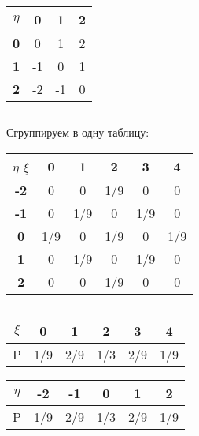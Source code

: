 \documentclass[a4paper,10pt]{article}
\begin{document}
\begin{center}
\begin{tabular}{|c|c|c|c|}
\hline
$\eta$ & \textbf{0} & \textbf{1} & \textbf{2} \\
\hline
\textbf{0} & 0 & 1 & 2 \\
\hline
\textbf{1} & -1 & 0 & 1 \\
\hline
\textbf{2} & -2 & -1 & 0 \\
\hline
\end{tabular}
\end{center}

\subsection{}
Сгруппируем в одну таблицу:

\begin{center}
\begin{tabular}{|c|c|c|c|c|c|}
\hline
$\eta$ \vline $\xi$ & \textbf{0} & \textbf{1} & \textbf{2} & \textbf{3} & \textbf{4} \\
\hline
\textbf{-2} & 0 & 0 & 1/9 & 0 & 0 \\
\hline
\textbf{-1} & 0 & 1/9 & 0 & 1/9 & 0 \\
\hline
\textbf{0} & 1/9 & 0 & 1/9 & 0 & 1/9 \\
\hline
\textbf{1} & 0 & 1/9 & 0 & 1/9 & 0 \\
\hline
\textbf{2} & 0 & 0 & 1/9 & 0 & 0 \\
\hline
\end{tabular}
\end{center}

\subsection{}

\begin{center}
\begin{tabular}{|c|c|c|c|c|c|}
\hline
$\xi$ & \textbf{0} & \textbf{1} & \textbf{2} & \textbf{3} & \textbf{4} \\
\hline
P & 1/9 & 2/9 & 1/3 & 2/9 & 1/9 \\
\hline
\end{tabular}
\end{center}

\begin{center}
\begin{tabular}{|c|c|c|c|c|c|}
\hline
$\eta$ & \textbf{-2} & \textbf{-1} & \textbf{0} & \textbf{1} & \textbf{2} \\
\hline
P & 1/9 & 2/9 & 1/3 & 2/9 & 1/9 \\
\hline
\end{tabular}
\end{center}
\end{document}
